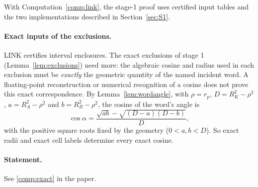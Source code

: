 \documentclass[11pt]{article}
\theoremstyle{definition}
\theoremstyle{remark}
\begin{document}
With Computation~\ref{comp:link}, the stage-1 proof uses certified input tables
and the two implementations described in Section~\ref{sec:S1}.

\paragraph{Exact inputs of the exclusions.} LINK certifies interval
enclosures. The exact exclusions of stage 1 (Lemma~\ref{lem:exclusions})
need more: the algebraic cosine and radius used in each exclusion must be
\emph{exactly} the geometric quantity of the named incident word. A floating-point reconstruction or numerical recognition of a cosine
does not prove this exact correspondence. By
Lemma~\ref{lem:wordangle}, with $\rho=r_p$, $D=R_K^2-\rho^2$,
$a=R_A^2-\rho^2$ and $b=R_B^2-\rho^2$, the cosine of the word's angle is
\[
\cos\alpha=\frac{\sqrt{ab}-\sqrt{(D-a)(D-b)}}{D},
\]
with the positive square roots fixed by the geometry ($0<a,b<D$). So exact
radii and exact cell labels determine every exact cosine.

\setcounter{theorem}{5}
\paragraph{Statement.} See \ref{comp:exact} in the paper.
\end{document}
